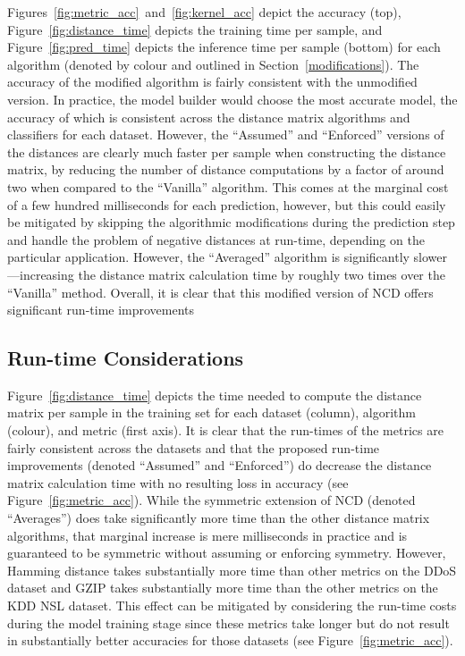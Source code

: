 \documentclass[preprint,12pt]{article}
\begin{document}
Figures~\ref{fig:metric_acc}~and~\ref{fig:kernel_acc} depict the accuracy (top), Figure~\ref{fig:distance_time} depicts the training time per sample, and Figure~\ref{fig:pred_time} depicts the inference time per sample (bottom) for each algorithm (denoted by colour and outlined in Section~\ref{modifications}).
The accuracy of the modified algorithm is fairly consistent with the unmodified version. 
In practice, the model builder would choose the most accurate model, the accuracy of which is consistent across the distance matrix algorithms and classifiers for each dataset.
However, the ``Assumed'' and ``Enforced'' versions of the distances are clearly much faster per sample when constructing the distance matrix, by reducing the number of distance computations by a factor of around two when compared to the ``Vanilla'' algorithm.
This comes at the marginal cost of a few hundred milliseconds for each prediction, however, but this could easily be mitigated by skipping the algorithmic modifications during the prediction step and handle the problem of negative distances at run-time, depending on the particular application. 
However, the ``Averaged'' algorithm is significantly slower---increasing the distance matrix calculation time by roughly two times over the ``Vanilla'' method.
Overall, it is clear that this modified version of NCD offers significant run-time improvements 



\subsection{Run-time Considerations}

Figure~\ref{fig:distance_time} depicts the time needed to compute the distance matrix per sample in the training set for each dataset (column), algorithm (colour), and metric (first axis).
It is clear that the run-times of the metrics are fairly consistent across the datasets and that the proposed run-time improvements (denoted ``Assumed'' and ``Enforced'') do decrease the distance matrix calculation time with no resulting loss in accuracy (see Figure~\ref{fig:metric_acc}).
While the symmetric extension of NCD (denoted ``Averages'') does take significantly more time than the other distance matrix algorithms, that marginal increase is mere milliseconds in practice and is guaranteed to be symmetric without assuming or enforcing symmetry.
However, Hamming distance takes substantially more time than other metrics on the DDoS dataset and GZIP takes substantially more time than the other metrics on the KDD NSL dataset.
This effect can be mitigated by considering the run-time costs during the model training stage since these metrics take longer but do not result in substantially better accuracies for those datasets (see Figure~\ref{fig:metric_acc}).
\end{document}
